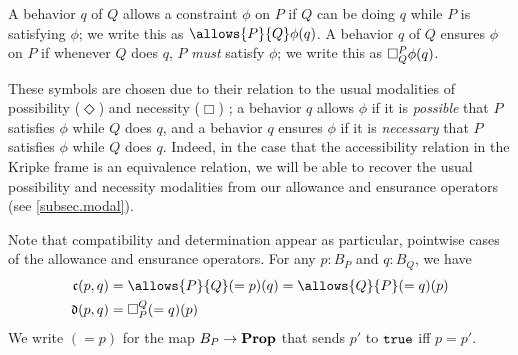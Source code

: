     A behavior $q$ of $Q$ allows a constraint $\phi$ on $P$ if $Q$ can be doing $q$ while $P$ is satisfying $\phi$; we write this as $\allows{P}{Q}\phi(q)$. A behavior $q$ of $Q$ ensures $\phi$ on $P$ if whenever $Q$ does $q$, $P$ \emph{must} satisfy $\phi$; we write this as $\ensure{P}{Q}\phi(q)$.
    
    These symbols are chosen due to their relation to the usual modalities of possibility ($\Diamond$) and necessity ($\Box$) \cite{kripke1963semantical}; a behavior $q$ allows $\phi$ if it is \emph{possible} that $P$ satisfies $\phi$ while $Q$ does $q$, and a behavior $q$ ensures $\phi$ if it is \emph{necessary} that $P$ satisfies $\phi$ while $Q$ does $q$. Indeed, in the case that the accessibility relation in the Kripke frame is an equivalence relation, we will be able to recover the usual possibility and necessity modalities from our allowance and ensurance operators (see \cref{subsec.modal}).
    
    Note that compatibility and determination appear as particular, pointwise cases of the allowance and ensurance operators. For any $p:B_P$ and $q:B_Q$, we have
    \begin{align*}
        \mathfrak{c}(p, q) &= \allows{P}{Q}(=p)(q) = \allows{Q}{P}(=q)(p) \\
        \mathfrak{d}(p, q) &= \ensure{Q}{P}(=q)(p)
    \end{align*}
    We write $(=p)$ for the map $B_P\to\Prop$ that sends $p'$ to $\true$ iff $p=p'$.
    
